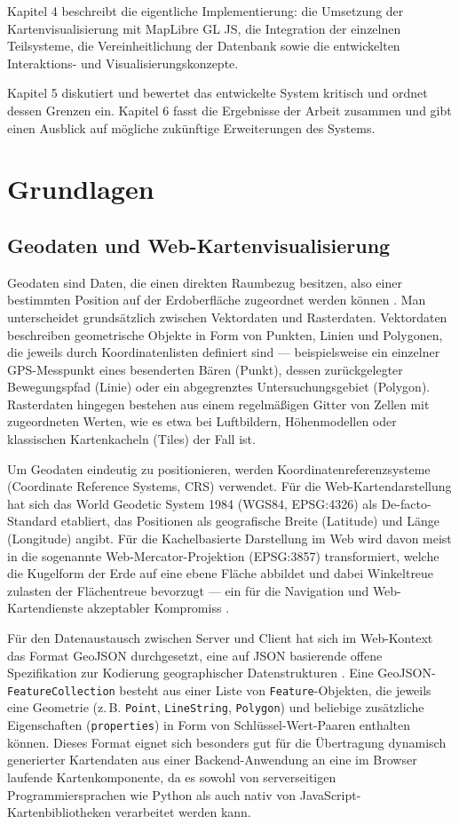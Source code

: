 \documentclass[12pt,a4paper]{report}
\begin{document}
Kapitel 4 beschreibt die eigentliche Implementierung: die Umsetzung der Kartenvisualisierung mit MapLibre GL JS, die Integration der einzelnen Teilsysteme, die Vereinheitlichung der Datenbank sowie die entwickelten Interaktions- und Visualisierungskonzepte.

Kapitel 5 diskutiert und bewertet das entwickelte System kritisch und ordnet dessen Grenzen ein. Kapitel 6 fasst die Ergebnisse der Arbeit zusammen und gibt einen Ausblick auf mögliche zukünftige Erweiterungen des Systems.


\chapter{Grundlagen}

\section{Geodaten und Web-Kartenvisualisierung}

Geodaten sind Daten, die einen direkten Raumbezug besitzen, also einer bestimmten Position auf der Erdoberfläche zugeordnet werden können \cite{TODO:GISGrundlagen}. Man unterscheidet grundsätzlich zwischen Vektordaten und Rasterdaten. Vektordaten beschreiben geometrische Objekte in Form von Punkten, Linien und Polygonen, die jeweils durch Koordinatenlisten definiert sind — beispielsweise ein einzelner GPS-Messpunkt eines besenderten Bären (Punkt), dessen zurückgelegter Bewegungspfad (Linie) oder ein abgegrenztes Untersuchungsgebiet (Polygon). Rasterdaten hingegen bestehen aus einem regelmäßigen Gitter von Zellen mit zugeordneten Werten, wie es etwa bei Luftbildern, Höhenmodellen oder klassischen Kartenkacheln (Tiles) der Fall ist.

Um Geodaten eindeutig zu positionieren, werden Koordinatenreferenzsysteme (Coordinate Reference Systems, CRS) verwendet. Für die Web-Kartendarstellung hat sich das World Geodetic System 1984 (WGS84, EPSG:4326) als De-facto-Standard etabliert, das Positionen als geografische Breite (Latitude) und Länge (Longitude) angibt. Für die Kachelbasierte Darstellung im Web wird davon meist in die sogenannte Web-Mercator-Projektion (EPSG:3857) transformiert, welche die Kugelform der Erde auf eine ebene Fläche abbildet und dabei Winkeltreue zulasten der Flächentreue bevorzugt — ein für die Navigation und Web-Kartendienste akzeptabler Kompromiss \cite{TODO:WebMercator}.

Für den Datenaustausch zwischen Server und Client hat sich im Web-Kontext das Format GeoJSON durchgesetzt, eine auf JSON basierende offene Spezifikation zur Kodierung geographischer Datenstrukturen \cite{TODO:GeoJSONSpec}. Eine GeoJSON-\texttt{FeatureCollection} besteht aus einer Liste von \texttt{Feature}-Objekten, die jeweils eine Geometrie (z.\,B. \texttt{Point}, \texttt{LineString}, \texttt{Polygon}) und beliebige zusätzliche Eigenschaften (\texttt{properties}) in Form von Schlüssel-Wert-Paaren enthalten können. Dieses Format eignet sich besonders gut für die Übertragung dynamisch generierter Kartendaten aus einer Backend-Anwendung an eine im Browser laufende Kartenkomponente, da es sowohl von serverseitigen Programmiersprachen wie Python als auch nativ von JavaScript-Kartenbibliotheken verarbeitet werden kann.
\end{document}
